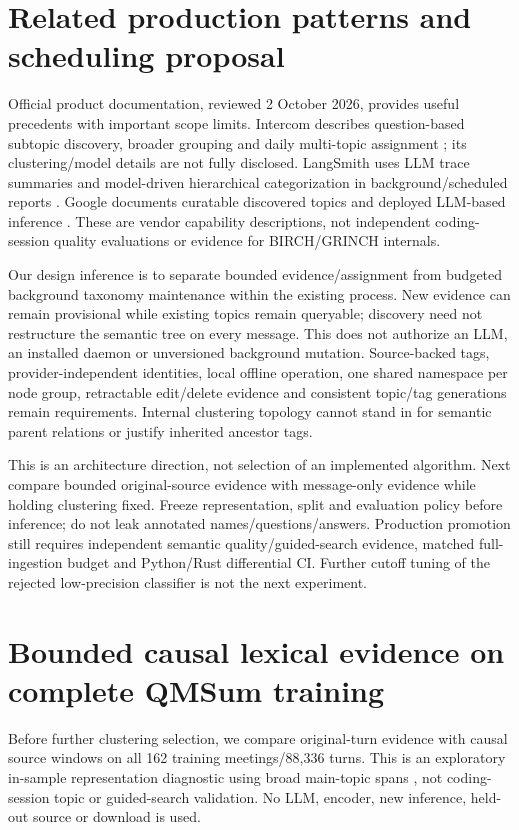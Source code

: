 \documentclass[11pt]{article}
\begin{document}
\section{Related production patterns and scheduling proposal}
Official product documentation, reviewed 2 October 2026, provides useful
precedents with important scope limits. Intercom describes question-based
subtopic discovery, broader grouping and daily multi-topic assignment
\cite{intercomtopics}; its clustering/model details are not fully disclosed.
LangSmith uses LLM trace summaries and model-driven hierarchical categorization
in background/scheduled reports \cite{langsmithinsights}. Google documents
curatable discovered topics and deployed LLM-based inference \cite{googlecxtopics}.
These are vendor capability descriptions, not independent coding-session
quality evaluations or evidence for BIRCH/GRINCH internals.

Our design inference is to separate bounded evidence/assignment from budgeted
background taxonomy maintenance within the existing process. New evidence can
remain provisional while existing topics remain queryable; discovery need not
restructure the semantic tree on every message. This does not authorize an LLM,
an installed daemon or unversioned background mutation. Source-backed tags,
provider-independent identities, local offline operation, one shared namespace
per node group, retractable edit/delete evidence and consistent topic/tag
generations remain requirements. Internal clustering topology cannot stand in
for semantic parent relations or justify inherited ancestor tags.

This is an architecture direction, not selection of an implemented algorithm.
Next compare bounded original-source evidence with message-only evidence while
holding clustering fixed. Freeze representation, split and evaluation policy
before inference; do not leak annotated names/questions/answers. Production
promotion still requires independent semantic quality/guided-search evidence,
matched full-ingestion budget and Python/Rust differential CI. Further cutoff
tuning of the rejected low-precision classifier is not the next experiment.

\section{Bounded causal lexical evidence on complete QMSum training}
Before further clustering selection, we compare original-turn evidence with
causal source windows on all 162 training meetings/88,336 turns. This is an
exploratory in-sample representation diagnostic using broad main-topic spans
\cite{zhong2021qmsum}, not coding-session topic or guided-search validation.
No LLM, encoder, new inference, held-out source or download is used.
\end{document}
